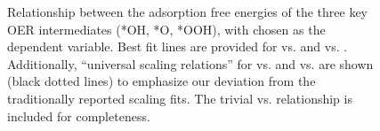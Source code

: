 \begin{figure}
\centering
{}
\caption{\label{fig:scaling_relations}
Relationship between the adsorption free energies of the three key OER intermediates (*OH, *O, *OOH), with \DGOH chosen as the dependent variable.
Best fit lines are provided for \DGOOH vs. \DGOH and \DGO vs. \DGOH.
Additionally, ``universal scaling relations'' for \DGOOH vs. \DGOH and \DGO vs. \DGOH are shown (black dotted lines) to emphasize our deviation from the traditionally reported scaling fits.
The trivial \DGOH vs. \DGOH relationship is included for completeness.
}
\end{figure}

